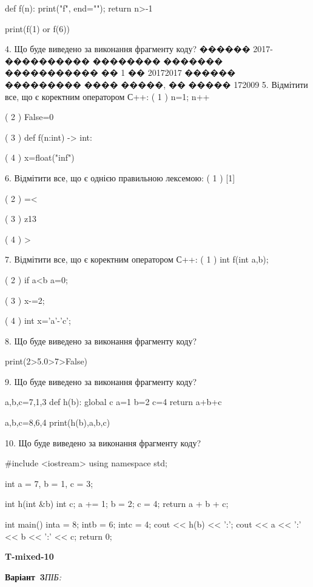 \documentclass[11pt]{article}
\begin{document}
def f(n):
    print("f", end="");
    return n>-1

print(f(1) or f(6))

4. Що буде виведено за виконання фрагменту коду?
������ 2017-���������� �������� ������� ����������� �� 1 �� 20172017 ������ ��������� ���� �����, �� ����� 172009
5. Відмітити все, що є коректним оператором С++:
( 1 ) n=1; n++

( 2 ) False=0

( 3 ) def f(n:int) -> int:

( 4 ) x=float("inf")

6. Відмітити все, що є однією правильною лексемою:
( 1 ) [1]

( 2 ) =<

( 3 ) z13

( 4 ) >

7. Відмітити все, що є коректним оператором С++:
( 1 ) int f(int a,b);

( 2 ) if a<b a=0;

( 3 ) x-=2;

( 4 ) int x='a'-'c';

8. Що буде виведено за виконання фрагменту коду?

print(2>5.0>7>False)

9. Що буде виведено за виконання фрагменту коду?

a,b,c=7,1,3
def h(b):
global c    a=1
    b=2
    c=4
    return a+b+c

a,b,c=8,6,4
print(h(b),a,b,c)

10. Що буде виведено за виконання фрагменту коду?

#include <iostream>
using namespace std;

int a = 7, b = 1, c = 3;

int h(int &b){
int c;    a += 1;
    b = 2;
    c = 4;
    return a + b + c;
}

int main(){
    inta = 8;
    intb = 6;
    intc = 4;
    cout << h(b) << ':';
    cout << a << ':' << b << ':' << c;
    return 0; 
}











\newpage
{\large\textbf{T-mixed-10}}

\textbf{Варіант \No\,3}\hfill \textit{ПІБ:}\,\underline{\hspace{60mm}}
\vspace{4mm}
\end{document}
